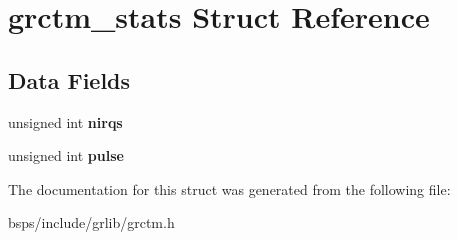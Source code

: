 \hypertarget{structgrctm__stats}{}\section{grctm\+\_\+stats Struct Reference}
\label{structgrctm__stats}
\subsection*{Data Fields}
\begin{DoxyCompactItemize}
\item 
\mbox{\label{structgrctm__stats_ae572c2c13784547a0440e9eb9745cbbf}} 
unsigned int {\bfseries nirqs}
\item 
\mbox{\label{structgrctm__stats_a8b984e08a45531f7b8566adb20a8a48b}} 
unsigned int {\bfseries pulse}
\end{DoxyCompactItemize}


The documentation for this struct was generated from the following file\+:\begin{DoxyCompactItemize}
\item 
bsps/include/grlib/grctm.\+h\end{DoxyCompactItemize}
